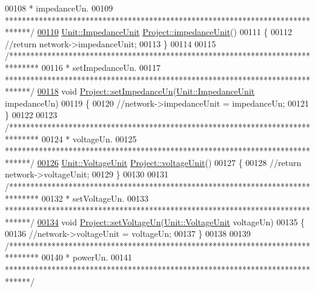 \begin{DoxyCode}
00108 \textcolor{comment}{ * impedanceUn.}
00109 \textcolor{comment}{ ******************************************************************************/}
\hypertarget{project_8cpp_source_l00110}{}\hyperlink{class_project_ad0725b9aa4445dd6d21d4e15df482d3b}{00110} \hyperlink{class_unit_a3747e779c805df24a71961290be3fbdf}{Unit::ImpedanceUnit} \hyperlink{class_project_ad0725b9aa4445dd6d21d4e15df482d3b}{Project::impedanceUnit}()
00111 \{
00112   \textcolor{comment}{//return network->impedanceUnit;}
00113 \}
00114 
00115 \textcolor{comment}{/*******************************************************************************}
00116 \textcolor{comment}{ * setImpedanceUn.}
00117 \textcolor{comment}{ ******************************************************************************/}
\hypertarget{project_8cpp_source_l00118}{}\hyperlink{class_project_a995d050781923522ae2a02728346d199}{00118} \textcolor{keywordtype}{void} \hyperlink{class_project_a995d050781923522ae2a02728346d199}{Project::setImpedanceUn}(\hyperlink{class_unit_a3747e779c805df24a71961290be3fbdf}{Unit::ImpedanceUnit} impedanceUn)
00119 \{
00120   \textcolor{comment}{//network->impedanceUnit = impedanceUn;}
00121 \}
00122 
00123 \textcolor{comment}{/*******************************************************************************}
00124 \textcolor{comment}{ * voltageUn.}
00125 \textcolor{comment}{ ******************************************************************************/}
\hypertarget{project_8cpp_source_l00126}{}\hyperlink{class_project_a93b928093072ba15c24693b03a934e4e}{00126} \hyperlink{class_unit_a55b07dfa9457e1eca2c7194fe0cfc3c1}{Unit::VoltageUnit} \hyperlink{class_project_a93b928093072ba15c24693b03a934e4e}{Project::voltageUnit}()
00127 \{
00128   \textcolor{comment}{//return network->voltageUnit;}
00129 \}
00130 
00131 \textcolor{comment}{/*******************************************************************************}
00132 \textcolor{comment}{ * setVoltageUn.}
00133 \textcolor{comment}{ ******************************************************************************/}
\hypertarget{project_8cpp_source_l00134}{}\hyperlink{class_project_aa26b488b2e93c8a8c6b4423ce07df4a1}{00134} \textcolor{keywordtype}{void} \hyperlink{class_project_aa26b488b2e93c8a8c6b4423ce07df4a1}{Project::setVoltageUn}(\hyperlink{class_unit_a55b07dfa9457e1eca2c7194fe0cfc3c1}{Unit::VoltageUnit} voltageUn)
00135 \{
00136   \textcolor{comment}{//network->voltageUnit = voltageUn;}
00137 \}
00138 
00139 \textcolor{comment}{/*******************************************************************************}
00140 \textcolor{comment}{ * powerUn.}
00141 \textcolor{comment}{ ******************************************************************************/}

\end{DoxyCode}
